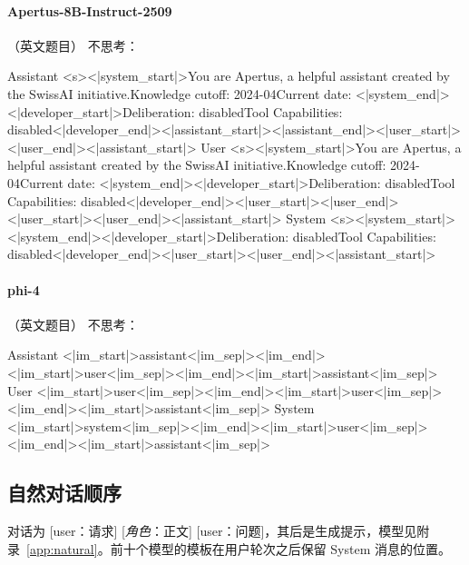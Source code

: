 \paragraph{Apertus-8B-Instruct-2509} （英文题目）
\noindent 不思考：
\begin{Rendering}
Assistant  <s><|system_start|>You are Apertus, a helpful assistant created by the SwissAI initiative.\NL{}Knowledge cutoff: 2024-04\NL{}Current date: <|system_end|><|developer_start|>Deliberation: disabled\NL{}Tool Capabilities: disabled<|developer_end|><|assistant_start|><|assistant_end|><|user_start|><|user_end|><|assistant_start|>
User       <s><|system_start|>You are Apertus, a helpful assistant created by the SwissAI initiative.\NL{}Knowledge cutoff: 2024-04\NL{}Current date: <|system_end|><|developer_start|>Deliberation: disabled\NL{}Tool Capabilities: disabled<|developer_end|><|user_start|><|user_end|><|user_start|><|user_end|><|assistant_start|>
System     <s><|system_start|><|system_end|><|developer_start|>Deliberation: disabled\NL{}Tool Capabilities: disabled<|developer_end|><|user_start|><|user_end|><|assistant_start|>
\end{Rendering}
\paragraph{phi-4} （英文题目）
\noindent 不思考：
\begin{Rendering}
Assistant  <|im_start|>assistant<|im_sep|><|im_end|><|im_start|>user<|im_sep|><|im_end|><|im_start|>assistant<|im_sep|>
User       <|im_start|>user<|im_sep|><|im_end|><|im_start|>user<|im_sep|><|im_end|><|im_start|>assistant<|im_sep|>
System     <|im_start|>system<|im_sep|><|im_end|><|im_start|>user<|im_sep|><|im_end|><|im_start|>assistant<|im_sep|>
\end{Rendering}

\subsection{自然对话顺序}
\label{app:templates_natural}

对话为 [user：请求] [\textit{角色}：正文] [user：问题]，其后是生成提示，模型见附录~\ref{app:natural}。前十个模型的模板在用户轮次之后保留 System 消息的位置。

